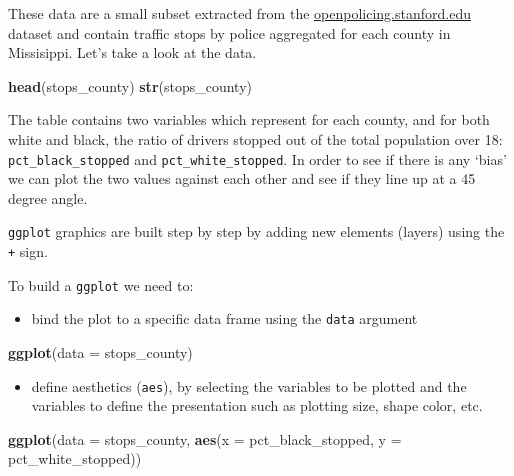 \documentclass[]{book}
\newenvironment{Shaded}{\begin{snugshade}}{\end{snugshade}}
\newcommand{\DataTypeTok}[1]{\textcolor[rgb]{0.13,0.29,0.53}{#1}}
\newcommand{\KeywordTok}[1]{\textcolor[rgb]{0.13,0.29,0.53}{\textbf{#1}}}
\newcommand{\NormalTok}[1]{#1}
\providecommand{\tightlist}{%
  \setlength{\itemsep}{0pt}\setlength{\parskip}{0pt}}
\begin{document}
These data are a small subset extracted from the \href{https://openpolicing.stanford.edu}{openpolicing.stanford.edu} dataset and contain traffic stops by police aggregated for each county in Missisippi. Let's take a look at the data.

\begin{Shaded}
\begin{Highlighting}[]
\KeywordTok{head}\NormalTok{(stops_county)}
\KeywordTok{str}\NormalTok{(stops_county)}
\end{Highlighting}
\end{Shaded}

The table contains two variables which represent for each county, and for both white and black, the ratio of drivers stopped out of the total population over 18: \texttt{pct\_black\_stopped} and \texttt{pct\_white\_stopped}. In order to see if there is any `bias' we can plot the two values against each other and see if they line up at a 45 degree angle.

\texttt{ggplot} graphics are built step by step by adding new elements (layers) using the \texttt{+} sign.

To build a \texttt{ggplot} we need to:

\begin{itemize}
\tightlist
\item
  bind the plot to a specific data frame using the \texttt{data} argument
\end{itemize}

\begin{Shaded}
\begin{Highlighting}[]
\KeywordTok{ggplot}\NormalTok{(}\DataTypeTok{data =}\NormalTok{ stops_county)}
\end{Highlighting}
\end{Shaded}

\begin{itemize}
\tightlist
\item
  define aesthetics (\texttt{aes}), by selecting the variables to be plotted and the variables to define the presentation such as plotting size, shape color, etc.
\end{itemize}

\begin{Shaded}
\begin{Highlighting}[]
\KeywordTok{ggplot}\NormalTok{(}\DataTypeTok{data =}\NormalTok{ stops_county, }\KeywordTok{aes}\NormalTok{(}\DataTypeTok{x =}\NormalTok{ pct_black_stopped, }\DataTypeTok{y =}\NormalTok{ pct_white_stopped))}
\end{Highlighting}
\end{Shaded}
\end{document}
